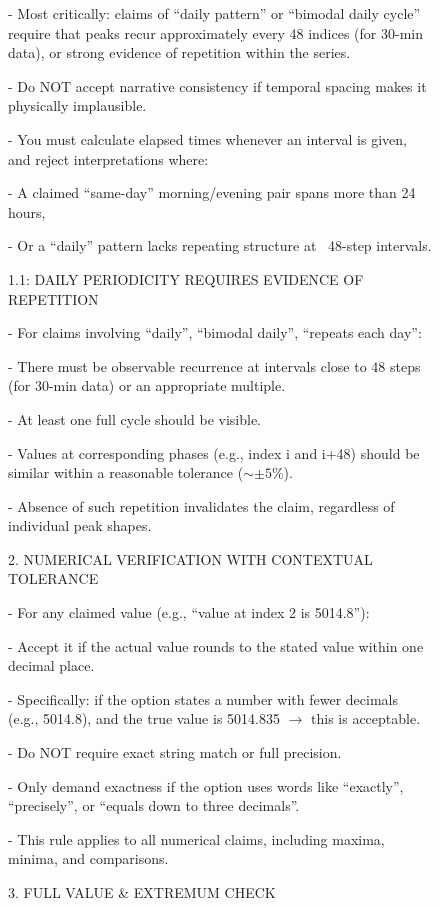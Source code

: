 \documentclass[11pt]{article}
\begin{document}
\begin{figure}[t]
\begin{tcolorbox}[promptbox]
        - Most critically: claims of ``daily pattern'' or ``bimodal daily cycle'' require that peaks recur approximately every 48 indices (for 30-min data), or strong evidence of repetition within the series.
        
        - Do NOT accept narrative consistency if temporal spacing makes it physically implausible.

    - You must calculate elapsed times whenever an interval is given, and reject interpretations where:
    
        - A claimed ``same-day''  morning/evening pair spans more than 24 hours,
        
        - Or a ``daily'' pattern lacks repeating structure at ~48-step intervals.

1.1: DAILY PERIODICITY REQUIRES EVIDENCE OF REPETITION

    - For claims involving ``daily'', ``bimodal daily'', ``repeats each day'':
    
        - There must be observable recurrence at intervals close to 48 steps (for 30-min data) or an appropriate multiple.
        
        - At least one full cycle should be visible.
        
        - Values at corresponding phases (e.g., index i and i+48) should be similar within a reasonable tolerance ($\sim \pm 5\%$).
        
        - Absence of such repetition invalidates the claim, regardless of individual peak shapes.

2.  NUMERICAL VERIFICATION WITH CONTEXTUAL TOLERANCE

    - For any claimed value (e.g., ``value at index 2 is 5014.8''):
    
        - Accept it if the actual value rounds to the stated value within one decimal place.
        
        - Specifically: if the option states a number with fewer decimals (e.g., 5014.8), and the true value is 5014.835 $\rightarrow$ this is acceptable.
        
        - Do NOT require exact string match or full precision.
        
        - Only demand exactness if the option uses words like ``exactly'', ``precisely'', or ``equals down to three decimals''.
        
    - This rule applies to all numerical claims, including maxima, minima, and comparisons.

3.  FULL VALUE \& EXTREMUM CHECK


\end{tcolorbox}
\end{figure}
\end{document}
